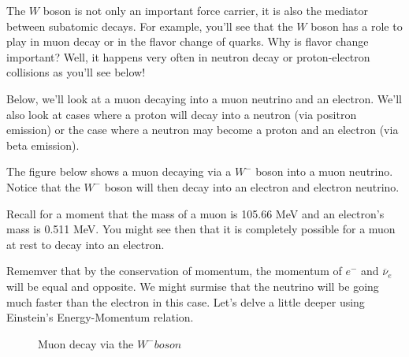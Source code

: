 \documentclass{article}
\begin{document}
The $W$ boson is not only an important force carrier, it is also the mediator between subatomic decays. For example, you'll see that the $W$ boson has a role to play in muon decay or in the flavor change of quarks. Why is flavor change important? Well, it happens very often in neutron decay or proton-electron collisions as you'll see below!


Below, we'll look at a muon decaying into a muon neutrino and an electron. We'll also look at cases where a proton will decay into a neutron (via positron emission) or the case where a neutron may become a proton and an electron (via beta emission).

The figure below shows a muon decaying via a $W^-$ boson into a muon neutrino. Notice that the $W^-$ boson will then decay into an electron and electron neutrino.

Recall for a moment that the mass of a muon is 105.66 MeV and an electron's mass is 0.511 MeV. You might see then that it is completely possible for a muon at rest to decay into an electron.

Rememver that by the conservation of momentum, the momentum of $e^{-}$ and $\overline{\nu}_{e}$ will be equal and opposite. We might surmise that the neutrino will be going much faster than the electron in this case. Let's delve a little deeper using Einstein's Energy-Momentum relation.
\begin{figure}[h]
    \centering
    \caption{Muon decay via the $W^- boson$}\label{fig:C1-1}
\end{figure}
\end{document}
